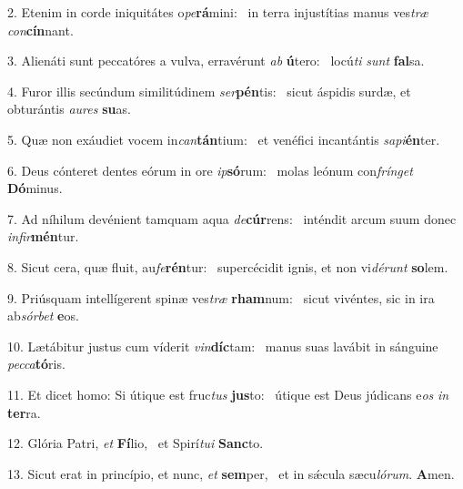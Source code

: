 2. Etenim in corde iniquitátes o\textit{pe}\textbf{rá}mini: \ast\  in terra injustítias manus ves\textit{træ} \textit{con}\textbf{cín}nant.\

3. Alienáti sunt peccatóres a vulva, erravérunt \textit{ab} \textbf{ú}tero: \ast\  locú\textit{ti} \textit{sunt} \textbf{fal}sa.\

4. Furor illis secúndum similitúdinem \textit{ser}\textbf{pén}tis: \ast\  sicut áspidis surdæ, et obturántis \textit{au}\textit{res} \textbf{su}as.\

5. Quæ non exáudiet vocem in\textit{can}\textbf{tán}tium: \ast\  et venéfici incantántis \textit{sa}\textit{pi}\textbf{én}ter.\

6. Deus cónteret dentes eórum in ore \textit{ip}\textbf{só}rum: \ast\  molas leónum con\textit{frín}\textit{get} \textbf{Dó}minus.\

7. Ad níhilum devénient tamquam aqua \textit{de}\textbf{cúr}rens: \ast\  inténdit arcum suum donec \textit{in}\textit{fir}\textbf{mén}tur.\

8. Sicut cera, quæ fluit, au\textit{fe}\textbf{rén}tur: \ast\  supercécidit ignis, et non vi\textit{dé}\textit{runt} \textbf{so}lem.\

9. Priúsquam intellígerent spinæ ves\textit{træ} \textbf{rham}num: \ast\  sicut vivéntes, sic in ira ab\textit{sór}\textit{bet} \textbf{e}os.\

10. Lætábitur justus cum víderit \textit{vin}\textbf{díc}tam: \ast\  manus suas lavábit in sánguine \textit{pec}\textit{ca}\textbf{tó}ris.\

11. Et dicet homo: Si útique est fruc\textit{tus} \textbf{jus}to: \ast\  útique est Deus júdicans e\textit{os} \textit{in} \textbf{ter}ra.\

12. Glória Patri, \textit{et} \textbf{Fí}lio, \ast\  et Spirí\textit{tu}\textit{i} \textbf{Sanc}to.\

13. Sicut erat in princípio, et nunc, \textit{et} \textbf{sem}per, \ast\  et in sǽcula sæcu\textit{ló}\textit{rum}. \textbf{A}men.\


